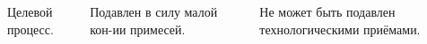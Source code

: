 \documentclass[9pt,pdf]{beamer}
\begin{document}
\begin{frame}
\begin{columns}
\begin{column}{.333\textwidth}
\begin{center}
{
                    }
                  \end{center}
            \end{column}
        \end{columns}
        \vfill
        \begin{columns}
            \begin{column}{.333\textwidth}
                Целевой процесс.
            \end{column}
            \hfill
            \begin{column}{.333\textwidth}
                Подавлен в силу малой кон-ии примесей.
            \end{column}
            \hfill
            \begin{column}{.333\textwidth}
                Не может быть подавлен технологическими приёмами.
            \end{column}
        \end{columns}
    \end{frame}
\end{document}
